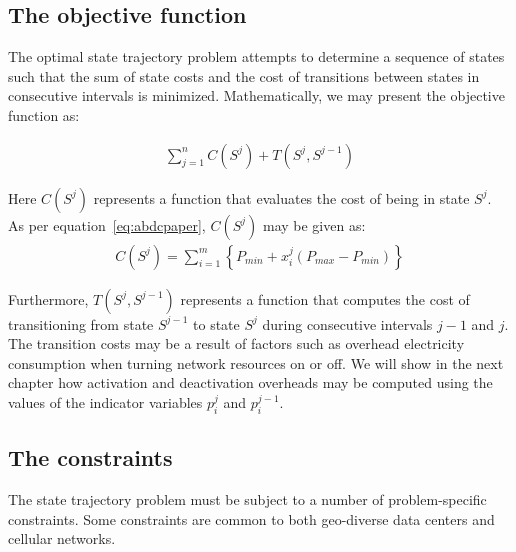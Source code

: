 \subsection{The objective function}
\label{subsec:framework:objective} %
The optimal state trajectory problem attempts to determine a sequence of states such that the sum of state costs and the cost of transitions between states in consecutive intervals is minimized. Mathematically, we may present the objective function as:

\begin{align}
\sum_{j=1}^n C(S^j) + T(S^j, S^{j-1})\label{eq:genobjective}
\end{align}

Here $C(S^j)$ represents a function that evaluates the cost of being in state $S^j$. As per equation~\ref{eq:abdcpaper}, $C(S^j)$ may be given as:
\begin{align}
C(S^j) = \sum_{i=1}^m \left\{ P_{min} + x_i^j (P_{max} - P_{min}) \right\}
\end{align}

Furthermore, $T(S^j,S^{j-1})$ represents a function that computes the cost of transitioning from state $S^{j-1}$ to state $S^j$ during consecutive intervals $j-1$ and $j$. The transition costs may be a result of factors such as overhead electricity consumption when turning network resources on or off. We will show in the next chapter how activation and deactivation overheads may be computed using the values of the indicator variables $p_i^j$ and $p_i^{j-1}$.

\subsection{The constraints}
\label{subsec:framework:constraints} %
The state trajectory problem must be subject to a number of problem-specific constraints. Some constraints are common to both geo-diverse data centers and cellular networks. 

